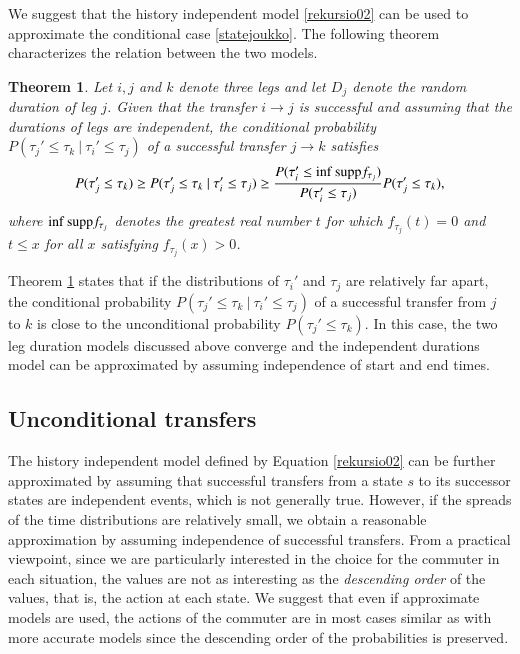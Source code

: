 \documentclass[dissertation,draft*]{aaltoseries}
\newtheorem{theorem}{Theorem}
\begin{document}
We suggest that the history independent model \eqref{rekursio02} can be used to
approximate the conditional case \eqref{statejoukko}.
The following theorem characterizes the relation between the two models.
\begin{theorem}
\label{durationthm}
Let $i,j$ and $k$ denote three legs and
let $D_j$ denote the random duration of leg $j$.
Given that the transfer $i \to j$ is successful and assuming that the durations of 
legs are independent, the conditional probability 
$P(\tau_{j}' \leq \tau_{k} \ | \ \tau_{i}' \leq \tau_{j})$ of a successful
transfer $j \to k$ satisfies
\begin{align*}
P(\tau_{j}' \leq \tau_{k}) \geq 
P(\tau_{j}' \leq \tau_{k} \ | \ \tau_{i}' \leq \tau_{j}) \geq 
\frac{P(\tau_{i}' \leq \textnormal{inf supp} f_{\tau_{j}})}{P(\tau_{i}' \leq \tau_{j})} P(\tau_{j}' \leq \tau_{k}), 
\end{align*}
where $\textnormal{inf supp} f_{\tau_{j}}$ denotes the greatest real number $t$ for which $f_{\tau_j}(t) = 0$ and
$t \leq x$ for all $x$ satisfying $f_{\tau_j}(x) > 0$.
\end{theorem}
Theorem \ref{durationthm} states that if the distributions of $\tau_i'$ and $\tau_j$ are
relatively far apart, the conditional probability $P(\tau_{j}' \leq \tau_{k} \ | \ \tau_{i}' \leq \tau_{j})$
of a successful transfer from $j$ to $k$ is close to the unconditional probability $P(\tau_{j}' \leq \tau_{k})$.
In this case, the two leg duration models discussed above converge and the 
independent durations model can be approximated by assuming independence of start and end times. 




\subsection{Unconditional transfers}
\label{unconditional}
The history independent model defined by Equation \eqref{rekursio02} can be further approximated by 
assuming that successful transfers from a state $s$ to its successor states are 
independent events, which is not generally true. However, if the 
spreads of the time distributions are relatively small, we obtain a 
reasonable approximation by assuming independence of successful transfers. 
From a practical viewpoint, since we are particularly interested in the choice for the commuter in 
each situation, the values 
are not as interesting  as the \emph{descending order} of the values, that is, the action at each state.
We suggest that even if approximate models are used, the actions of 
the commuter are in most cases similar as with more accurate models since the 
descending order of the probabilities is preserved.
\end{document}
